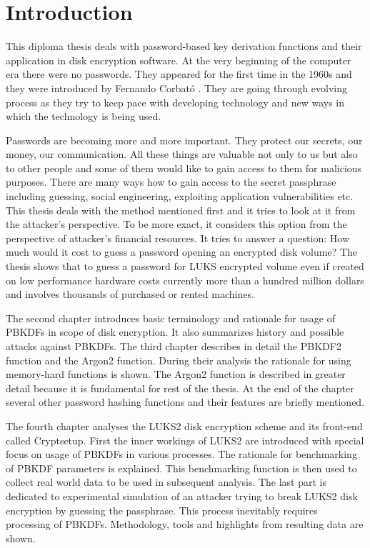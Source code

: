 \documentclass[nolof,digital]{fithesis3}
\begin{document}
\chapter{Introduction}
This diploma thesis deals with password-based key derivation functions and their application in disk encryption software. At the very beginning of the computer era there were no passwords. They appeared for the first time in the 1960s and they were introduced by Fernando Corbató \parencite{ctss}. They are going through evolving process as they try to keep pace with developing technology and new ways in which the technology is being used.

Passwords are becoming more and more important. They protect our secrets, our money, our communication. All these things are valuable not only to us but also to other people and some of them would like to gain access to them for malicious purposes. There are many ways how to gain access to the secret passphrase including guessing, social engineering, exploiting application vulnerabilities etc. This thesis deals with the method mentioned first and it tries to look at it from the attacker's perspective. To be more exact, it considers this option from the perspective of attacker's financial resources. It tries to answer a question: How much would it cost to guess a password opening an encrypted disk volume? The thesis shows that to guess a password for LUKS encrypted volume even if created on low performance hardware costs currently more than a hundred million dollars and involves thousands of purchased or rented machines.

The second chapter introduces basic terminology and rationale for usage of PBKDFs in scope of disk encryption. It also summarizes history and possible attacks against PBKDFs. The third chapter describes in detail the PBKDF2 function and the Argon2 function. During their analysis the rationale for using memory-hard functions is shown. The Argon2 function is described in greater detail because it is fundamental for rest of the thesis. At the end of the chapter several other password hashing functions and their features are briefly mentioned.

The fourth chapter analyses the LUKS2 disk encryption scheme and its front-end called Cryptsetup. First the inner workings of LUKS2 are introduced with special focus on usage of PBKDFs in various processes. The rationale for benchmarking of PBKDF parameters is explained. This benchmarking function is then used to collect real world data to be used in subsequent analysis. The last part is dedicated to experimental simulation of an attacker trying to break LUKS2 disk encryption by guessing the passphrase. This process inevitably requires processing of PBKDFs. Methodology, tools and highlights from resulting data are shown.
\end{document}
